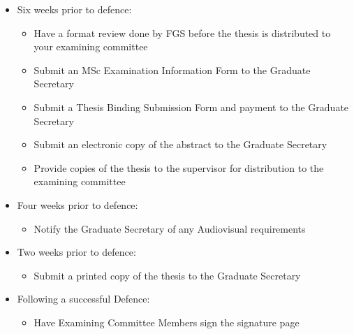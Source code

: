 \documentclass[12pt]{article}
\newcommand{\GS}{Graduate Secretary\xspace}
\begin{document}
\begin{itemize}
\item Six weeks prior to defence:

        \begin{itemize}

            \item Have a format review done by FGS before the thesis is
                distributed to your examining committee

            \item Submit an MSc Examination Information Form to the Graduate
                Secretary

            \item Submit a Thesis Binding Submission Form and payment to the
                \GS

            \item Submit an electronic copy of the abstract to the Graduate
                Secretary

            \item Provide copies of the thesis to the supervisor for
                distribution to the examining committee

        \end{itemize}

    \item Four weeks prior to defence:

        \begin{itemize}

            \item Notify the \GS of any Audiovisual requirements

        \end{itemize}

    \item Two weeks prior to defence:
        \begin{itemize}

            \item Submit a printed copy of the thesis to the \GS

        \end{itemize}

    \item Following a successful Defence:

        \begin{itemize}

            \item Have Examining Committee Members sign the signature page


\end{itemize}
\end{itemize}
\end{document}
